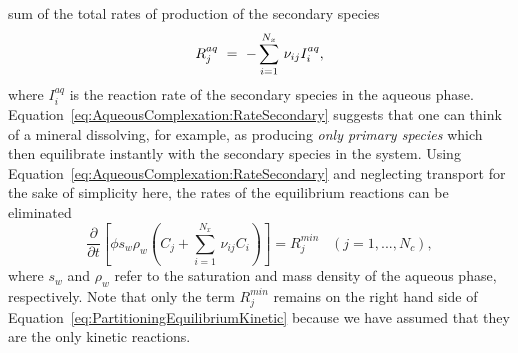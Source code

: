 sum of the total rates of production of the secondary
species~\citep{kirkner_1988}
%
\begin{equation}
  R_{j}^{aq} \ =\  -\sum _{i=1}^{N_{x} } \, \nu_{ ij} I_{i}^{aq} , 
 \label{eq:AqueousComplexation:RateSecondary} 
\end{equation} 
%
where $I_{i}^{aq}$ is the reaction rate of the secondary species in
the aqueous
phase. Equation~\eqref{eq:AqueousComplexation:RateSecondary} suggests
that one can think of a mineral dissolving, for example, as producing
\textit{only primary species} which then equilibrate instantly with
the secondary species in the system. Using
Equation~\eqref{eq:AqueousComplexation:RateSecondary} and neglecting
transport for the sake of simplicity here, the rates of the
equilibrium reactions can be eliminated~\citep{steefel_1996}
%
\begin{equation} \label{eq:PartitioningEquilibriumKinetic}
 \frac{\partial }{\partial t} \left[\phi s_w \rho _{w}  \left(C_{j} + \sum _{i=1}^{N_{x} } \, \nu _{ij} C_{i} \right)\right] =R_{j}^{min} \; \; \; (j=1,...,N_{c} ),
\end{equation} 
where $s_w$ and $\rho_w$ refer to the saturation and mass density of
the aqueous phase, respectively.  Note that only the term 
$R_{j}^{min} $ remains on the right hand side of
Equation~\eqref{eq:PartitioningEquilibriumKinetic} because we have
assumed that they are the only kinetic reactions.

